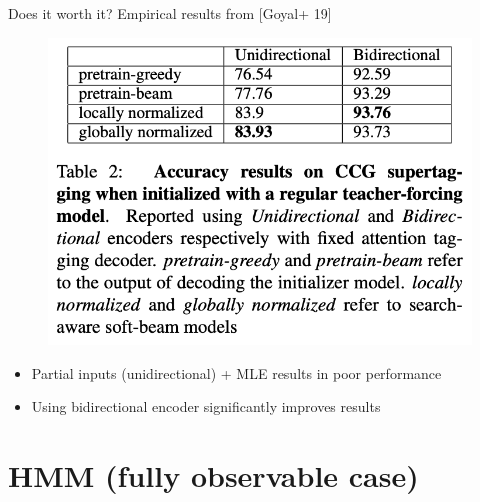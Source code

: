 \documentclass[usenames,dvipsnames,notes,11pt,aspectratio=169]{beamer}
\newcommand{\pdfnote}[1]{}
\begin{document}
\begin{frame}
    {Does it worth it?}
    Empirical results from [Goyal+ 19]
    \vspace{-1em}
    \begin{figure}
        \includegraphics[scale=0.3]{figures/global-local-paper}
    \end{figure}
    \vspace{-1em}
    \begin{itemize}
        \item Partial inputs (unidirectional) + MLE results in poor performance
            \pdfnote{pretrain-greedy/beam: MLE}
        \item Using bidirectional encoder significantly improves results 
            \pdfnote{seach-aware training and globally normalized models help but biLSTM is easier.}
    \end{itemize}
\end{frame}

\section{HMM (fully observable case)}
\end{document}
